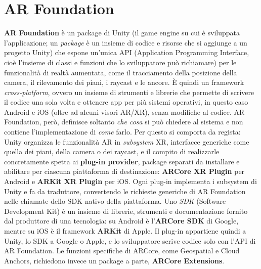 \chapter{AR Foundation}
\textbf{AR Foundation}\cite{AR-Foundation-1}\cite{AR-Foundation-2} è un package di Unity (il game engine su cui è sviluppata l'applicazione; un \textit{package} è un insieme di codice e risorse che si aggiunge a un progetto Unity) che espone un'unica API (Application Programming Interface, cioè l'insieme di classi e funzioni che lo sviluppatore può richiamare) per le funzionalità di realtà aumentata, come il tracciamento della posizione della camera, il rilevamento dei piani, i raycast e le ancore. È quindi un framework \textit{cross-platform}, ovvero un insieme di strumenti e librerie che permette di scrivere il codice una sola volta e ottenere app per più sistemi operativi, in questo caso Android e iOS (oltre ad alcuni visori AR/XR), senza modifiche al codice. AR Foundation, però, definisce soltanto \textit{che cosa} si può chiedere al sistema e non contiene l'implementazione di \textit{come} farlo. Per questo si comporta da regista: Unity organizza le funzionalità AR in \textit{subsystem} XR, interfacce generiche come quella dei piani, della camera o dei raycast, e il compito di realizzarle concretamente spetta ai \textbf{plug-in provider}, package separati da installare e abilitare per ciascuna piattaforma di destinazione: \textbf{ARCore XR Plugin} per Android e \textbf{ARKit XR Plugin} per iOS. Ogni plug-in implementa i subsystem di Unity e fa da traduttore, convertendo le richieste generiche di AR Foundation nelle chiamate dello SDK nativo della piattaforma. Uno \textit{SDK} (Software Development Kit) è un insieme di librerie, strumenti e documentazione fornito dal produttore di una tecnologia: su Android è l'\textbf{ARCore SDK} di Google, mentre su iOS è il framework \textbf{ARKit} di Apple. Il plug-in appartiene quindi a Unity, lo SDK a Google o Apple, e lo sviluppatore scrive codice solo con l'API di AR Foundation. Le funzioni specifiche di ARCore, come Geospatial e Cloud Anchors, richiedono invece un package a parte, \textbf{ARCore Extensions}.

